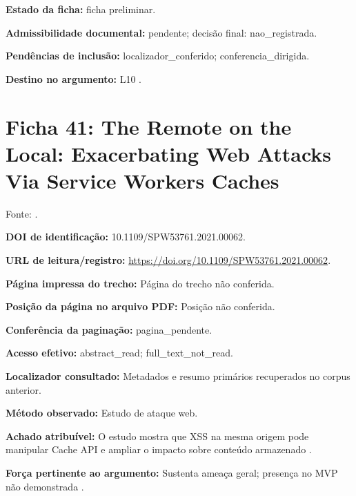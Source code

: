 \noindent\textbf{Estado da ficha:} ficha preliminar.\par\medskip

\noindent\textbf{Admissibilidade documental:} pendente; decisão final: nao\_registrada.\par\medskip

\noindent\textbf{Pendências de inclusão:} localizador\_conferido; conferencia\_dirigida.\par\medskip

\noindent\textbf{Destino no argumento:} L10 .

\clearpage\section*{Ficha 41: The Remote on the Local: Exacerbating Web Attacks Via Service Workers Caches}

Fonte: \citet{OS01}.

\noindent\textbf{DOI de identificação:} 10.1109/SPW53761.2021.00062.\par\medskip

\noindent\textbf{URL de leitura/registro:} \url{https://doi.org/10.1109/SPW53761.2021.00062}.\par\medskip

\noindent\textbf{Página impressa do trecho:} Página do trecho não conferida.\par\medskip

\noindent\textbf{Posição da página no arquivo PDF:} Posição não conferida.\par\medskip

\noindent\textbf{Conferência da paginação:} pagina\_pendente.\par\medskip

\noindent\textbf{Acesso efetivo:} abstract\_read; full\_text\_not\_read.\par\medskip

\noindent\textbf{Localizador consultado:} Metadados e resumo primários recuperados no corpus anterior.\par\medskip

\noindent\textbf{Método observado:} Estudo de ataque web.\par\medskip

\noindent\textbf{Achado atribuível:} O estudo mostra que XSS na mesma origem pode manipular Cache API e ampliar o impacto sobre conteúdo armazenado \citep{OS01}.\par\medskip

\noindent\textbf{Força pertinente ao argumento:} Sustenta ameaça geral; presença no MVP não demonstrada \citep{OS01}.\par\medskip


